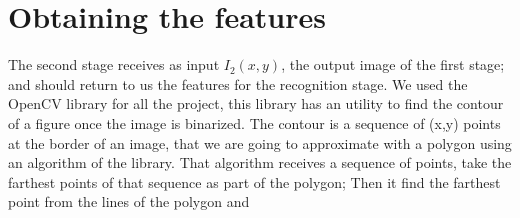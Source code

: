 \documentclass{article}
\begin{document}
	\section{Obtaining the features}
	The second stage receives as input $I_2(x,y)$, the output image of the first
	stage; and should return to us the features for the recognition stage. We used the 
	OpenCV library for all the project, this library has an utility to find the
	contour of a figure once the image is binarized. The contour is a sequence of
	(x,y) points at the border of an image, that we are going to approximate with a
	polygon using an algorithm of the library. That algorithm receives a sequence
	of points, take the farthest points of that sequence as part of the polygon;
	Then it find the farthest point from the lines of the polygon and 
\end{document}
